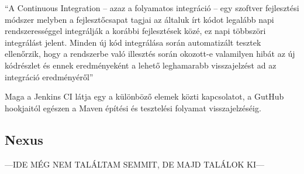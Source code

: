 “A Continuous Integration – azaz a folyamatos integráció – egy szoftver fejlesztési módszer melyben a fejlesztőcsapat tagjai az általuk írt kódot legalább napi rendszerességgel integrálják a korábbi fejlesztések közé, ez napi többszöri integrálást jelent. Minden új kód integrálása során automatizált tesztek ellenőrzik, hogy a rendszerbe való illesztés során okozott-e valamilyen hibát az új kódrészlet és ennek eredményeként a lehető leghamarabb visszajelzést ad az integráció eredményéről”
\cite{fowler2006continuous}

Maga a Jenkins CI látja egy a különböző elemek közti kapcsolatot, a GutHub hookjaitól egészen a Maven építési és tesztelési folyamat visszajelzéséig. 

\subsection{Nexus}

---IDE MÉG NEM TALÁLTAM SEMMIT, DE MAJD TALÁLOK KI---
